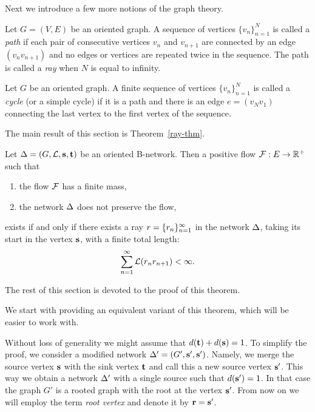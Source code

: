 \documentclass[12pt,oneside,a4paper]{amsart}
\begin{document}
    Next we introduce a few more notions of the graph theory.
    \begin{definition}
      Let $G = (V, E)$ be an oriented graph.
      A sequence of vertices $\{v_n\}_{n=1}^N$ is called a \emph{path} if each pair of consecutive vertices
        $v_n$ and $v_{n+1}$ are connected by an edge $(v_n v_{n+1})$ and no edges or vertices are repeated twice in the sequence.
      The path is called a \emph{ray} when $N$ is equal to infinity.
    \end{definition}
    \begin{definition}
      Let $G$ be an oriented graph.
      A finite sequence of vertices $\{v_n\}_{n=1}^N$ is called a \emph{cycle} (or a simple cycle) if it is
        a path and there is an edge $e = (v_N v_1)$ connecting the last vertex to the first vertex of the sequence.
    \end{definition}

    The main result of this section is Theorem~\ref{ray-thm}.
    \begin{theorem}
      \label{ray-thm}
      Let $\Delta = (G, \mathcal{L}, \mathbf{s}, \mathbf{t})$ be an oriented B-network.
      Then a positive flow $\mathcal{F}: E \to \mathbb{R}^{+}$ such that
      \begin{enumerate}[label=(\alph*)]
        \item the flow $\mathcal{F}$ has a finite mass,
        \item the network $\Delta$ does not preserve the flow,
      \end{enumerate}
      exists if and only if there exists a ray $r = \{{r}_n\}_{n=1}^\infty$ in the network $\Delta$, taking its start in the vertex $\mathbf{s}$,
        with a finite total length:
      \[
        \sum_{n=1}^\infty \mathcal{L}(r_n r_{n+1}) < \infty.
      \]
    \end{theorem}
    The rest of this section is devoted to the proof of this theorem.

    We start with providing an equivalent variant of this theorem, which will be easier to work with.

      Without loss of generality we might assume that $d(\mathbf{t}) + d(\mathbf{s}) = 1$.
      To simplify the proof, we consider a modified network $\Delta' = (G', \mathbf{s}', \mathbf{s}')$.
      Namely, we merge the source vertex $\mathbf{s}$ with the sink vertex $\mathbf{t}$ and call this a new source vertex $\mathbf{s}'$.
      This way we obtain a network $\Delta'$ with a single source such that $d(\mathbf{s}') = 1$.
      In that case the graph $G'$ is a rooted graph with the root at the vertex $\mathbf{s}'$.
      From now on we will employ the term \emph{root vertex} and denote it by $\mathbf{r} = \mathbf{s}'$.
\end{document}
